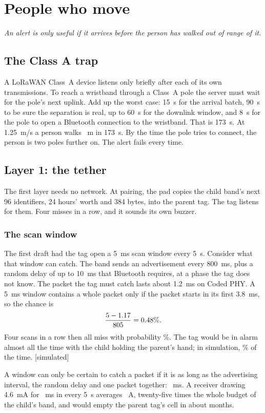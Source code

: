 \documentclass[11pt,a4paper,twoside,openany]{book}
\newcommand{\hook}[1]{{\noindent\fontsize{13}{19}\selectfont\itshape\color{rsmuted}#1\par}\vspace{12pt}}
\newcommand{\lbl}[1]{\textsf{\footnotesize\color{rsmuted}[#1]}}
\begin{document}
\chapter{People who move}\label{ch:move}
\hook{An alert is only useful if it arrives before the person has walked out of range of it.}
\section{The Class A trap}
A LoRaWAN Class~A device listens only briefly after each of its own transmissions. To reach a wristband through a
Class~A pole the server must wait for the pole's next uplink. Add up the worst case: 15~s for the arrival batch, 90~s
to be sure the separation is real, up to 60~s for the downlink window, and 8~s for the pole to open a Bluetooth
connection to the wristband. That is 173~s. At 1.25~m/s a person walks \ClassAWalk~m in 173~s. By the time the pole
tries to connect, the person is two poles further on. The alert fails every time.

\section{Layer 1: the tether}
The first layer needs no network. At pairing, the pad copies the child band's next 96 identifiers, 24 hours' worth and
384 bytes, into the parent tag. The tag listens for them. Four misses in a row, and it sounds its own buzzer.

\subsection*{The scan window}
The first draft had the tag open a 5~ms scan window every 5~s. Consider what that window can catch. The band sends an
advertisement every 800~ms, plus a random delay of up to 10~ms that Bluetooth requires, at a phase the tag does not
know. The packet the tag must catch lasts about 1.2~ms on Coded PHY. A 5~ms window contains a whole packet only if the
packet starts in its first 3.8~ms, so the chance is
\[\frac{5-1.17}{805}=0.48\%.\]
Four scans in a row then all miss with probability \TetherAlarm\%. The tag would be in alarm almost all the time with
the child holding the parent's hand; in simulation, \TetherAlarmSim\% of the time. \lbl{simulated}

A window can only be certain to catch a packet if it is as long as the advertising interval, the random delay and one
packet together: \TetherWindow~ms. A receiver drawing 4.6~mA for \TetherWindow~ms in every 5~s averages
\TetherUa~\textmu A, twenty-five times the whole budget of the child's band, and would empty the parent tag's cell in
about \ParentLife{} months.
\end{document}
